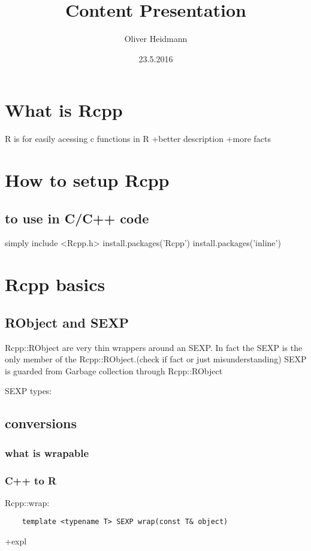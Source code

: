 \documentclass{article}
\title{Content Presentation}
\date{23.5.2016}
\author{Oliver Heidmann}
\begin{document}
\maketitle
\newpage
\tableofcontents
\newpage

\section{What is Rcpp}

    R is for easily acessing c functions in R
    +better description
    +more facts
\section{How to setup Rcpp}

    \subsection{to use in C/C++ code}
        simply include \textless Rcpp.h\textgreater
        \newline
        install.packages('Rcpp')
        \newline
        install.packages('inline')

\section{Rcpp basics}
    \subsection{RObject and SEXP}
        Rcpp::RObject are very thin wrappers around an SEXP. 
        In fact the SEXP is the only member of the Rcpp::RObject.(check if fact or just
        misunderstanding)
        \newline
        SEXP is guarded from Garbage collection through Rcpp::RObject

        SEXP types:
            
    \subsection{conversions}
        \subsubsection{what is wrapable}
        \subsubsection{C++ to R}
            Rcpp::wrap:
            \begin{verbatim}
    template <typename T> SEXP wrap(const T& object)
            \end{verbatim}
            +expl
\end{document}
